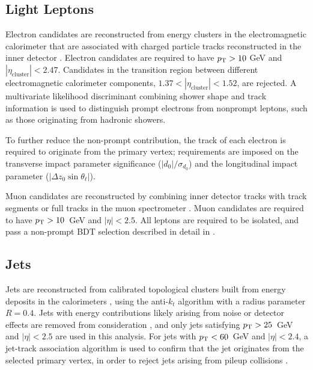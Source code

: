 \subsection{Light Leptons}
\label{subsec:lepSelection}

Electron candidates are reconstructed from energy clusters in the electromagnetic calorimeter that are associated with charged particle tracks reconstructed in the inner detector \cite{ATLAS-CONF-2016-024}.  Electron candidates are required to have $p_{\text{T}} > 10$ GeV and $|\eta_\textrm{cluster}| < 2.47$. Candidates in the transition region between different electromagnetic calorimeter components, $1.37 < |\eta_\textrm{cluster}| < 1.52$, are rejected. A multivariate likelihood discriminant combining shower shape and track information is used to distinguish prompt electrons from nonprompt leptons, such as those originating from hadronic showers. 

To further reduce the non-prompt contribution, the track of each electron is required to originate from the primary vertex; requirements are imposed on the transverse impact parameter significance ($|d_0|/\sigma_{d_0}$) and the longitudinal impact parameter ($|\Delta z_0 \sin \theta_\ell|$).

Muon candidates are reconstructed by combining inner detector tracks with track segments or full tracks in the muon spectrometer \cite{PERF-2014-05}. Muon candidates are required to have $p_{\text{T}} > 10$~GeV and $|\eta| < 2.5$. All leptons are required to be isolated, and pass a non-prompt BDT selection described in detail in \cite{ttH_paper}.

\subsection{Jets}
\label{subsec:jetSelection}

Jets are reconstructed from calibrated topological clusters built from energy deposits in the calorimeters \cite{ATL-PHYS-PUB-2015-015}, using the anti-$k_t$ algorithm with a radius parameter $R=0.4$.  Jets with energy contributions likely arising from noise or detector effects are removed from consideration \cite{ATLAS-CONF-2015-029}, and only jets satisfying $p_{\text{T}} > 25$~GeV and $|\eta| < 2.5$ are used in this analysis.  For jets with $p_{\text{T}} < 60$~GeV and $|\eta| < 2.4$, a jet-track association algorithm is used to confirm that the jet originates from the selected primary vertex, in order to reject jets arising from pileup collisions \cite{PERF-2014-03}. 

